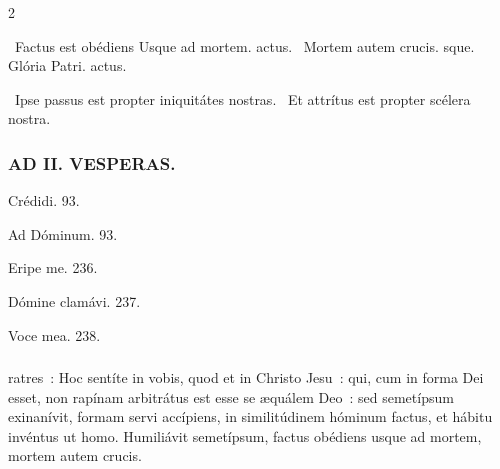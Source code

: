 \documentclass[9pt,twoside]{extarticle}
\begin{document}
\begin{multicols}{2}
{{\begin{tightlist}{}
\item {}~Factus est obédiens \textred{*} Usque ad mortem. actus. ~Mortem autem crucis. sque. Glória Patri. actus.
\item {}~Ipse passus est propter iniquitátes nostras. ~Et attrítus est propter scélera nostra.
\end{tightlist}

\subsubsection*{\center \textsc{AD II. VESPERAS.}}
\begin{tightlist}{}
\item {}
\item {} Crédidi. 93.
\item {} Ad Dóminum. 93.
\item {} Eripe me. 236.
\item {} Dómine clamávi. 237.
\item {} Voce mea. 238.
\end{tightlist}

\subsubsection*{}
ratres~: Hoc sentíte in vobis, quod et in Christo Jesu~: qui, cum in forma Dei esset, non rapínam arbitrátus est esse se æquálem Deo~: sed semetípsum exinanívit, formam servi accípiens, in similitúdinem hóminum factus, et hábitu invéntus ut homo. Humiliávit semetípsum, factus obédiens usque ad mortem, mortem autem crucis.

}}
\end{multicols}
\end{document}
